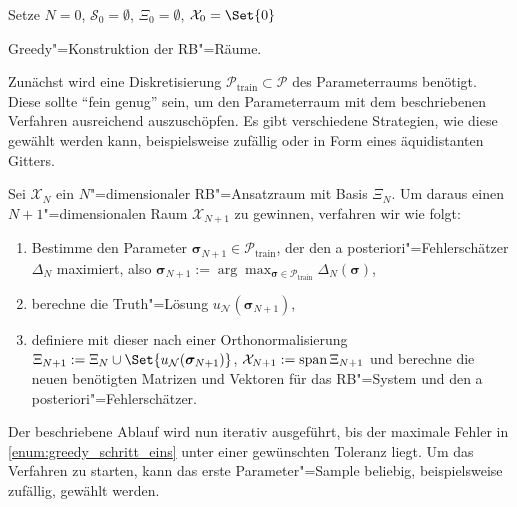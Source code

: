 \documentclass[../main.tex]{subfiles}
\begin{document}
\begin{algorithm}[tb]
    \BlankLine
    Setze $N = 0$, $\mathcal S_{0} = \emptyset$, $\Xi_{0} = \emptyset$, $\mathcal X_{0} = \Set{0}$\;
    \caption{Greedy"=Konstruktion der RB"=Räume.}
    \label{algorithm:greedy_training}
\end{algorithm}

Zunächst wird eine Diskretisierung $\mathcal P_{\mathrm{train}} \subset \mathcal P$ des Parameterraums benötigt.
Diese sollte \enquote{fein genug} sein, um den Parameterraum mit dem beschriebenen Verfahren ausreichend auszuschöpfen.
Es gibt verschiedene Strategien, wie diese gewählt werden kann, beispielsweise zufällig oder in Form eines äquidistanten Gitters.

Sei $\mathcal X_{N}$ ein $N$"=dimensionaler RB"=Ansatzraum mit Basis $\Xi_{N}$.
Um daraus einen $N+1$"=dimensionalen Raum $\mathcal X_{N + 1}$ zu gewinnen, verfahren wir wie folgt:
\begin{enumerate}[label={\itshape\roman*.},ref={\itshape\roman*}]
    \item\label{enum:greedy_schritt_eins} Bestimme den Parameter $\bm \sigma_{N+1} \in \mathcal P_{\mathrm{train}}$, der den a posteriori"=Fehlerschätzer $\Delta_{N}$ maximiert, also $\bm \sigma_{N+1} := \arg \max_{\bm \sigma \in \mathcal P_{\mathrm{train}}} \Delta_{N}(\bm \sigma)$,
    \item berechne die Truth"=Lösung $u_{\mathcal N}(\bm \sigma_{N+1})$,
    \item definiere mit dieser nach einer Orthonormalisierung $\Xi_{N + 1} := \Xi_{N} \cup \Set{u_{\mathcal N}(\bm \sigma_{N+1})}$, $\mathcal X_{N + 1} := \operatorname{span} \Xi_{N + 1}$ und berechne die neuen benötigten Matrizen und Vektoren für das RB"=System und den a posteriori"=Fehlerschätzer.
\end{enumerate}
Der beschriebene Ablauf wird nun iterativ ausgeführt, bis der maximale Fehler in \cref{enum:greedy_schritt_eins} unter einer gewünschten Toleranz liegt.
Um das Verfahren zu starten, kann das erste Parameter"=Sample beliebig, beispielsweise zufällig, gewählt werden.
\end{document}
